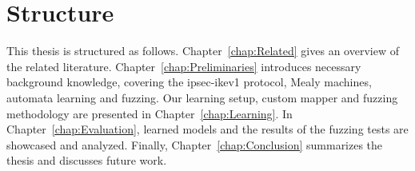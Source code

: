 \section{Structure}
This thesis is structured as follows. Chapter~\ref{chap:Related} gives an overview of the related literature. Chapter~\ref{chap:Preliminaries} introduces necessary background knowledge, covering the \ac{ipsec}-\ac{ike}v1 protocol, Mealy machines, automata learning and fuzzing. Our learning setup, custom mapper and fuzzing methodology are presented in Chapter~\ref{chap:Learning}. In Chapter~\ref{chap:Evaluation}, learned models and the results of the fuzzing tests are showcased and analyzed.
Finally, Chapter~\ref{chap:Conclusion} summarizes the thesis and discusses future work.